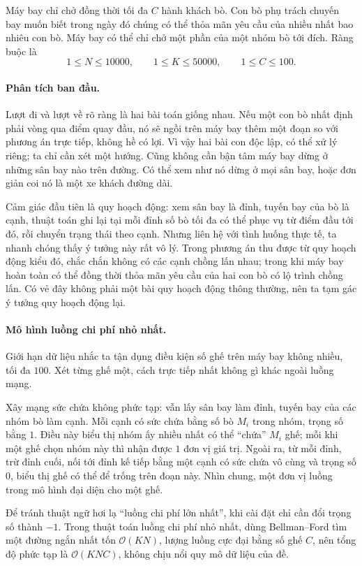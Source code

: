 \documentclass[11pt]{article}
\newcommand{\Oh}{\mathcal{O}}
\begin{document}
Máy bay chỉ chở đồng thời tối đa \(C\) hành khách bò. Con bò phụ trách chuyến
bay muốn biết trong ngày đó chúng có thể thỏa mãn yêu cầu của nhiều nhất bao
nhiêu con bò. Máy bay có thể chỉ chở một phần của một nhóm bò tới đích. Ràng
buộc là
\[
  1\le N\le 10000,\qquad 1\le K\le 50000,\qquad 1\le C\le 100.
\]

\paragraph{Phân tích ban đầu.}
Lượt đi và lượt về rõ ràng là hai bài toán giống nhau. Nếu một con bò nhất
định phải vòng qua điểm quay đầu, nó sẽ ngồi trên máy bay thêm một đoạn so
với phương án trực tiếp, không hề có lợi. Vì vậy hai bài con độc lập, có thể
xử lý riêng; ta chỉ cần xét một hướng. Cũng không cần bận tâm máy bay dừng ở
những sân bay nào trên đường. Có thể xem như nó dừng ở mọi sân bay, hoặc đơn
giản coi nó là một xe khách đường dài.

Cảm giác đầu tiên là quy hoạch động: xem sân bay là đỉnh, tuyến bay của bò là
cạnh, thuật toán ghi lại tại mỗi đỉnh số bò tối đa có thể phục vụ từ điểm đầu
tới đó, rồi chuyển trạng thái theo cạnh. Nhưng liên hệ với tình huống thực tế,
ta nhanh chóng thấy ý tưởng này rất vô lý. Trong phương án thu được từ quy
hoạch động kiểu đó, chắc chắn không có các cạnh chồng lấn nhau; trong khi máy
bay hoàn toàn có thể đồng thời thỏa mãn yêu cầu của hai con bò có lộ trình
chồng lấn. Có vẻ đây không phải một bài quy hoạch động thông thường, nên ta
tạm gác ý tưởng quy hoạch động lại.

\paragraph{Mô hình luồng chi phí nhỏ nhất.}
Giới hạn dữ liệu nhắc ta tận dụng điều kiện số ghế trên máy bay không nhiều,
tối đa \(100\). Xét từng ghế một, cách trực tiếp nhất không gì khác ngoài
luồng mạng.

Xây mạng sức chứa không phức tạp: vẫn lấy sân bay làm đỉnh, tuyến bay của các
nhóm bò làm cạnh. Mỗi cạnh có sức chứa bằng số bò \(M_i\) trong nhóm, trọng số
bằng \(1\). Điều này biểu thị nhóm ấy nhiều nhất có thể ``chứa'' \(M_i\) ghế;
mỗi khi một ghế chọn nhóm này thì nhận được \(1\) đơn vị giá trị. Ngoài ra,
từ mỗi đỉnh, trừ đỉnh cuối, nối tới đỉnh kế tiếp bằng một cạnh có sức chứa vô
cùng và trọng số \(0\), biểu thị ghế có thể để trống trên đoạn này. Nhìn chung,
một đơn vị luồng trong mô hình đại diện cho một ghế.

Để tránh thuật ngữ hơi lạ ``luồng chi phí lớn nhất'', khi cài đặt chỉ cần đổi
trọng số thành \(-1\). Trong thuật toán luồng chi phí nhỏ nhất, dùng
Bellman--Ford tìm một đường ngắn nhất tốn \(\Oh(KN)\), lượng luồng cực đại
bằng số ghế \(C\), nên tổng độ phức tạp là \(\Oh(KNC)\), không chịu nổi quy mô
dữ liệu của đề.
\end{document}
